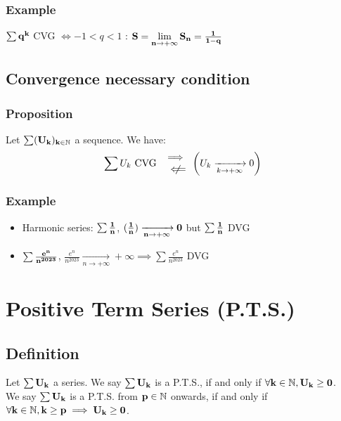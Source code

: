 \documentclass[notitlepage]{math}
\begin{document}
\subsubsection{Example}
$\bf \sum q^k$ CVG $\Leftrightarrow \minus 1 < q < 1$ : $\bf S = \lim\limits_{n \to +\infty} S_n = \frac{1}{1 - q}$

\subsection{Convergence necessary condition}
\subsubsection{Proposition}
Let $\bf \sum (U_k)_{k \in \mathbb{N}}$ a sequence. We have:
\[ \sum U_k \text{ CVG } \begin{array}{ r }\implies \\ \centernot{\Longleftarrow} \end{array} \left( U_k \xrightarrow[k \to +\infty]{} 0 \right) \]
\subsubsection{Example}
\begin{itemize}
    \item Harmonic series: $\bf \sum \frac{1}{n}$, $\bf (\frac{1}{n}) \xrightarrow[n \to +\infty]{} 0$ but $\bf \sum \frac{1}{n}$ DVG
    \item $\bf \sum \frac{e^n}{n^{2023}}$, $\frac{e^n}{n^{2023}} \xrightarrow[n \to +\infty]{} +\infty \implies \sum \frac{e^n}{n^{2023}}$ DVG
    \end{itemize}

\section{Positive Term Series (P.T.S.)}
\subsection{Definition}
Let $\bf \sum U_k$ a series. We say $\bf \sum U_k$ is a P.T.S., 
if and only if $\bf \forall k \in \mathbb{N}, U_k \geq 0$.\\
We say $\bf \sum U_k$ is a P.T.S. from $\bf p \in \mathbb{N}$ onwards,
if and only if $\bf \forall k \in \mathbb{N}, k \geq p \implies U_k \geq 0$.
\end{document}
